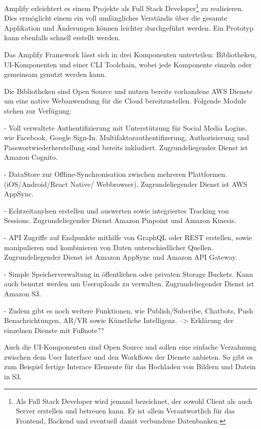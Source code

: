 {Amplify erleichtert es einem Projekte als Full Stack Developer\footnote{Als Full Stack Developer wird jemand bezeichnet, der sowohl Client als auch Server
erstellen und betreuen kann. Er ist allein Verantwortlich für das Frontend, Backend und eventuell damit verbundene Datenbanken.} zu realisieren.
Dies ermöglicht einem ein voll umfängliches Verständis über die gesamte Applikation und Änderungen können leichter durchgeführt werden.
Ein Prototyp kann ebenfalls schnell erstellt werden.

Das Amplify Framework lässt sich in drei Komponenten unterteilen: Bibliotheken, UI-Komponenten und einer CLI Toolchain, wobei jede Komponente einzeln oder gemeinsam genutzt werden kann.

Die Bibliotheken sind Open Source und nutzen bereits vorhandene AWS Dienste um eine native Webanwendung für die Cloud bereitzustellen.
Folgende Module stehen zur Verfügung:

- Voll verwaltete Authentifizierung mit Unterstützung für Social Media Logins, wie Facebook, Google Sign-In. Multifaktorauthentifizerung, Authorisierung und Passwortwiederherstellung sind
bereits inkludiert. Zugrundeliegender Dienst ist Amazon Cognito.

- DataStore zur Offline-Synchronisation zwischen mehreren Plattformen. (iOS/Android/React Native/ Webbrowser). Zugrundeliegender Dienst ist AWS AppSync.

- Echtzeitanylsen erstellen und auswerten sowie integriertes Tracking von Sessions. Zugrundeliegender Dienst Amazon Pinpoint und Amazon Kinesis.

- API Zugriffe auf Endpunkte mithilfe von GraphQL oder REST erstellen, sowie manipulieren und kombinieren von Daten unterschiedlicher Quellen. Zugrundeliegender Dienst ist Amazon AppSync und Amazon API Gateway.

- Simple Speicherverwaltung in öffentlichen oder privaten Storage Buckets. Kann auch benutzt werden um Useruploads zu verwalten. Zugrundeliegender Dienst ist Amazon S3.

- Zudem gibt es noch weitere Funktionen, wie Publish/Subcribe, Chatbots, Push Benachrichtungen, AR/VR sowie Künstliche Intelligenz.
--> Erklärung der einzelnen Dienste mit Fußnote??


Auch die UI-Komponenten sind Open Source und sollen eine einfache Verzahnung zwischen dem User Interface und den Workflows der Dienste anbieten.
So gibt es zum Beispiel fertige Interace Elemente für das Hochladen von Bildern und Datein in S3.

}

